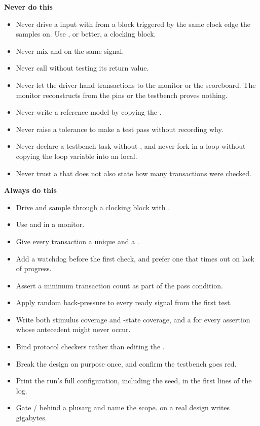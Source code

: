 \textbf{Never do this}

\begin{itemize}
\item Never drive a \DUT{} input with \code{=} from a block triggered by the
  same clock edge the \DUT{} samples on. Use \code{<=}, or better, a clocking
  block.
\item Never mix \code{=} and \code{<=} on the same signal.
\item Never call  without testing its return value.
\item Never let the driver hand transactions to the monitor or the scoreboard.
  The monitor reconstructs from the pins or the testbench proves nothing.
\item Never write a reference model by copying the \RTL{}.
\item Never raise a tolerance to make a test pass without recording why.
\item Never declare a testbench task without , and never fork
  in a loop without copying the loop variable into an  local.
\item Never trust a  that does not also state how many
  transactions were checked.
\end{itemize}

\textbf{Always do this}

\begin{itemize}
\item Drive and sample through a clocking block with .
\item Use \code{===} and \code{!==} in a monitor.
\item Give every transaction a unique  and a
  .
\item Add a watchdog before the first check, and prefer one that times out on
  lack of progress.
\item Assert a minimum transaction count as part of the pass condition.
\item Apply random back-pressure to every ready signal from the first test.
\item Write both stimulus coverage and \DUT{}-state coverage, and a
   for every assertion whose antecedent might never occur.
\item Bind protocol checkers rather than editing the \RTL{}.
\item Break the design on purpose once, and confirm the testbench goes red.
\item Print the run's full configuration, including the seed, in the first
  lines of the log.
\item Gate / behind a plusarg and name the
  scope.  on a real design writes gigabytes.
\end{itemize}

